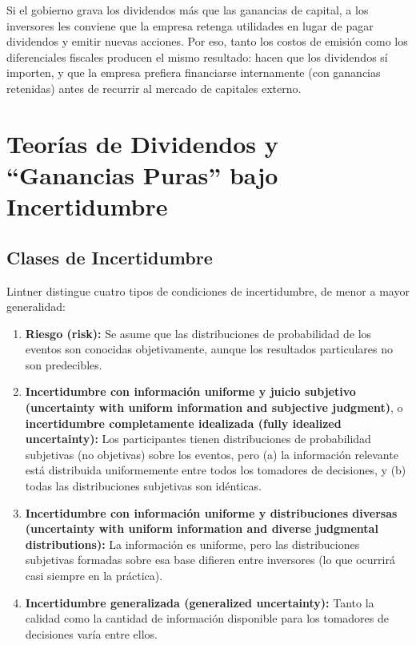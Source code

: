 \documentclass[12pt]{article}
\begin{document}
\begin{intuicion}
Si el gobierno grava los dividendos m\'as que las ganancias de capital, a los inversores les conviene que la empresa retenga utilidades en lugar de pagar dividendos y emitir nuevas acciones. Por eso, tanto los costos de emisi\'on como los diferenciales fiscales producen el mismo resultado: hacen que los dividendos s\'i importen, y que la empresa prefiera financiarse internamente (con ganancias retenidas) antes de recurrir al mercado de capitales externo.
\end{intuicion}

\section{Teor\'ias de Dividendos y ``Ganancias Puras'' bajo Incertidumbre}

\subsection{Clases de Incertidumbre}

Lintner distingue cuatro tipos de condiciones de incertidumbre, de menor a mayor generalidad:

\begin{enumerate}
  \item \textbf{Riesgo (risk):} Se asume que las distribuciones de probabilidad de los eventos son conocidas objetivamente, aunque los resultados particulares no son predecibles.

  \item \textbf{Incertidumbre con informaci\'on uniforme y juicio subjetivo (uncertainty with uniform information and subjective judgment)}, o \textbf{incertidumbre completamente idealizada (fully idealized uncertainty):} Los participantes tienen distribuciones de probabilidad subjetivas (no objetivas) sobre los eventos, pero (a) la informaci\'on relevante est\'a distribuida uniformemente entre todos los tomadores de decisiones, y (b) todas las distribuciones subjetivas son id\'enticas.

  \item \textbf{Incertidumbre con informaci\'on uniforme y distribuciones diversas (uncertainty with uniform information and diverse judgmental distributions):} La informaci\'on es uniforme, pero las distribuciones subjetivas formadas sobre esa base difieren entre inversores (lo que ocurrir\'a casi siempre en la pr\'actica).

  \item \textbf{Incertidumbre generalizada (generalized uncertainty):} Tanto la calidad como la cantidad de informaci\'on disponible para los tomadores de decisiones var\'ia entre ellos.
\end{enumerate}
\end{document}
